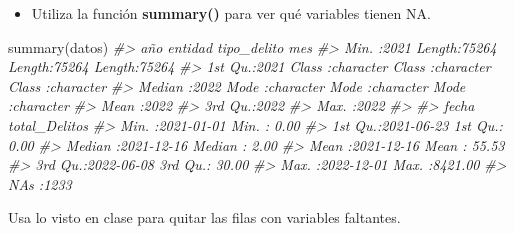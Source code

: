 \documentclass[
]{book}
\newenvironment{Shaded}{\begin{snugshade}}{\end{snugshade}}
\newcommand{\CommentTok}[1]{\textcolor[rgb]{0.56,0.35,0.01}{\textit{#1}}}
\newcommand{\FunctionTok}[1]{\textcolor[rgb]{0.00,0.00,0.00}{#1}}
\newcommand{\NormalTok}[1]{#1}
\providecommand{\tightlist}{%
  \setlength{\itemsep}{0pt}\setlength{\parskip}{0pt}}
\begin{document}
\begin{itemize}
\tightlist
\item
  Utiliza la función \textbf{summary()} para ver qué variables tienen NA.
\end{itemize}

\begin{Shaded}
\begin{Highlighting}[]
\FunctionTok{summary}\NormalTok{(datos)}
\CommentTok{\#\textgreater{}       año         entidad          tipo\_delito            mes           }
\CommentTok{\#\textgreater{}  Min.   :2021   Length:75264       Length:75264       Length:75264      }
\CommentTok{\#\textgreater{}  1st Qu.:2021   Class :character   Class :character   Class :character  }
\CommentTok{\#\textgreater{}  Median :2022   Mode  :character   Mode  :character   Mode  :character  }
\CommentTok{\#\textgreater{}  Mean   :2022                                                           }
\CommentTok{\#\textgreater{}  3rd Qu.:2022                                                           }
\CommentTok{\#\textgreater{}  Max.   :2022                                                           }
\CommentTok{\#\textgreater{}                                                                         }
\CommentTok{\#\textgreater{}      fecha            total\_Delitos    }
\CommentTok{\#\textgreater{}  Min.   :2021{-}01{-}01   Min.   :   0.00  }
\CommentTok{\#\textgreater{}  1st Qu.:2021{-}06{-}23   1st Qu.:   0.00  }
\CommentTok{\#\textgreater{}  Median :2021{-}12{-}16   Median :   2.00  }
\CommentTok{\#\textgreater{}  Mean   :2021{-}12{-}16   Mean   :  55.53  }
\CommentTok{\#\textgreater{}  3rd Qu.:2022{-}06{-}08   3rd Qu.:  30.00  }
\CommentTok{\#\textgreater{}  Max.   :2022{-}12{-}01   Max.   :8421.00  }
\CommentTok{\#\textgreater{}                       NA\textquotesingle{}s   :1233}
\end{Highlighting}
\end{Shaded}

Usa lo visto en clase para quitar las filas con variables faltantes.
\end{document}
